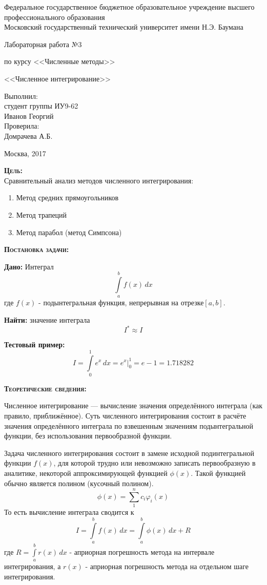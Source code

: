 \documentclass [12pt]{article}
\title{}
\date{}
\author{}
\begin{document}
\begin{titlepage}
\thispagestyle{empty}
\begin{center}
Федеральное государственное бюджетное образовательное учреждение высшего профессионального образования \\Московский государственный технический университет имени Н.Э. Баумана

\end{center}
\vfill
\centerline{\large{Лабораторная работа №3}}
\centerline{\large{по курсу <<Численные методы>>}}
\centerline{\large{<<Численное интегрирование>>}}
\vfill
\hfill\parbox{5cm} {
           Выполнил:\\
           студент группы ИУ9-62 \hfill \\
           Иванов Георгий\hfill \medskip\\
           Проверила:\\
           Домрачева А.Б.\hfill
       }
\centerline{Москва, 2017}
\clearpage
\end{titlepage}
\textsc{\textbf{Цель:}} 
\\ Сравнительный анализ методов численного интегрирования:
\begin{enumerate}
\item Метод средних прямоугольников
\item Метод трапеций
\item Метод парабол (метод Симпсона)
\end{enumerate}

\textsc{\textbf{Постановка задачи:}}

\textbf{Дано:}  Интеграл $$\int\limits_a^b f(x)\,dx $$где $f(x)$ - подынтегральная функция, непрерывная на отрезке$[a,b]$.

\textbf{Найти:} значение интеграла $$I^{*} \approx  I $$

\textbf{Тестовый пример:} $$ I = \int\limits_0^1 e^x\,dx = e^x \bigg|_0^1 = e - 1 = 1.718282$$

\textsc{\textbf{Теоретические сведения:}}

Численное интегрирование — вычисление значения определённого интеграла (как правило, приближённое). Суть численного интегрирования состоит в расчёте значения определённого интеграла по взвешенным значениям подынтегральной функции, без использования первообразной функции.

Задача численного интегрирования состоит в замене исходной подинтегральной функции $f(x)$, для которой трудно или невозможно записать первообразную в аналитике, некоторой аппроксимирующей функцией $\phi(x)$. Такой функцией обычно является полином (кусочный полином).$$\phi(x)=\sum\limits_1^n c_{i}\varphi_{i}(x)$$То есть вычисление интеграла сводится к $$I=\int\limits_a^b f(x)\,dx = \int\limits_a^b \phi(x)\,dx + R$$ где $R=\int\limits_a^b r(x)\,dx $ - априорная погрешность метода на интервале интегрирования, а $r(x)$ - априорная погрешность метода на отдельном шаге интегрирования. 
\end{document}
